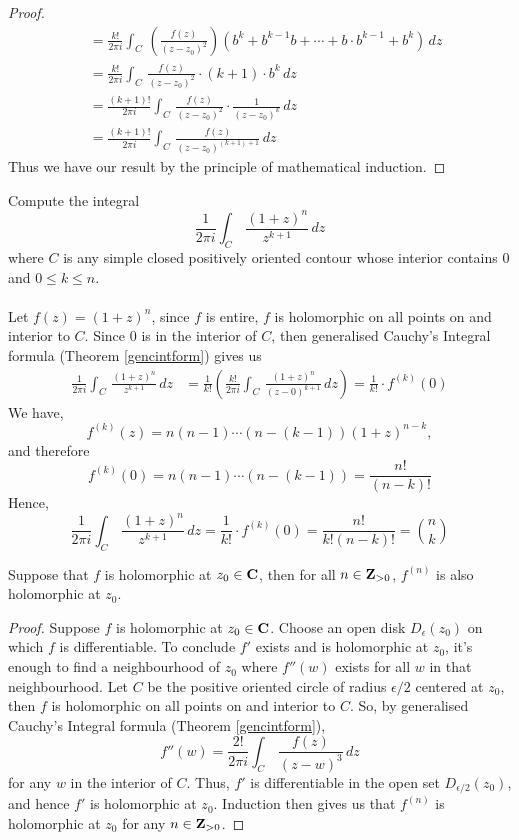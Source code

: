 \begin{proof}
\begin{align*}
 &= \frac{k!}{2\pi i}\int_C\,\left(\frac{f(z)}{(z - z_0)^2}\right)(b^k + b^{k-1}b + \cdots + b\cdot b^{k-1} + b^k)\,dz\\[1em]
 &= \frac{k!}{2\pi i}\int_C\,\frac{f(z)}{(z - z_0)^2}\cdot(k+1)\cdot b^k\,dz \\[1em]
 &= \frac{(k+1)!}{2\pi i}\int_C\,\frac{f(z)}{(z - z_0)^2}\cdot\frac{1}{(z - z_0)^k}\,dz \\[1em]
 &= \frac{(k+1)!}{2\pi i}\int_C\,\frac{f(z)}{(z - z_0)^{(k+1)+1}}\,dz 
\end{align*}
Thus we have our result by the principle of mathematical induction. 
\end{proof}


\begin{example}
Compute the integral
\[\frac{1}{2\pi i}\int_C\,\frac{(1 + z)^n}{z^{k+1}}\,dz\]
where $C$ is any simple closed positively oriented contour whose interior contains $0$ and $0 \leq k \leq n$.\\
\\
Let $f(z) = (1 + z)^n$, since $f$ is entire, $f$ is holomorphic on all points on and interior to $C$. Since $0$ is in the interior of $C$, then generalised Cauchy's Integral formula (Theorem \ref{gencintform}) gives us
\begin{align*}
\frac{1}{2\pi i}\int_C\,\frac{(1 + z)^n}{z^{k+1}}\,dz &= \frac{1}{k!}\left(\frac{k!}{2\pi i}\int_C\,\frac{(1 + z)^n}{(z - 0)^{k+1}}\,dz\right) = \frac{1}{k!}\cdot f^{(k)}(0)
\end{align*}
We have, 
\[f^{(k)}(z) = n(n-1)\cdots (n-(k-1))(1 + z)^{n-k},\]
and therefore
\[f^{(k)}(0) = n(n-1)\cdots (n-(k-1)) = \frac{n!}{(n-k)!}\]
Hence, 
\[\frac{1}{2\pi i}\int_C\,\frac{(1 + z)^n}{z^{k+1}}\,dz = \frac{1}{k!}\cdot f^{(k)}(0) = \frac{n!}{k!(n-k)!} = \binom{n}{k}\]
\end{example}

\vspace*{1em}

\begin{theorem}\label{holsmooth}
Suppose that $f$ is holomorphic at $z_0 \in \mathbf C$, then for all $n\in \mathbf Z_{>0}$, $f^{(n)}$ is also holomorphic at $z_0$. 
\end{theorem}
\begin{proof}
Suppose $f$ is holomorphic at $z_0 \in \mathbf C$. Choose an open disk $D_\epsilon(z_0)$ on which $f$ is differentiable. To conclude $f'$ exists and is holomorphic at $z_0$, it's enough to find a neighbourhood of $z_0$ where $f''(w)$ exists for all $w$ in that neighbourhood. Let $C$ be the positive oriented circle of radius $\epsilon/2$ centered at $z_0$, then $f$ is holomorphic on all points on and interior to $C$. So, by generalised Cauchy's Integral formula (Theorem \ref{gencintform}),
\[f''(w) = \frac{2!}{2\pi i}\int_C\,\frac{f(z)}{(z - w)^3}\,dz\]
for any $w$ in the interior of $C$. Thus, $f'$ is differentiable in the open set $D_{\epsilon/2}(z_0)$, and hence $f'$ is holomorphic at $z_0$. Induction then gives us that $f^{(n)}$ is holomorphic at $z_0$ for any $n\in \mathbf Z_{>0}$.
\end{proof}

